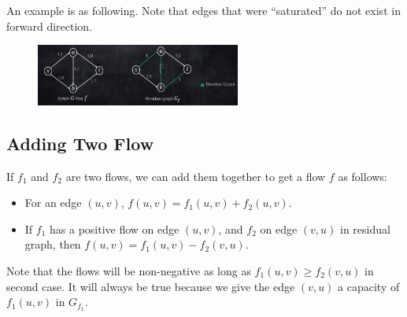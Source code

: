 An example is as following. Note that edges that were ``saturated'' do not exist in forward direction.
\begin{figure}[H]
	\centering
	\includegraphics[width=0.6\textwidth]{fig/gf.png}
\end{figure}

\subsection{Adding Two Flow}
If $f_1$ and $f_2$ are two flows, we can add them together to get a flow $f$ as follows:
\begin{itemize}
	\item For an edge $(u,v)$, $f(u,v) = f_1(u,v) + f_2(u,v)$.
	\item If $f_1$ has a positive flow on edge $(u, v)$, and $f_2$ on edge $(v, u)$ in residual graph, then $f(u,v) = f_1(u,v) - f_2(v,u)$.
\end{itemize}
Note that the flows will be non-negative as long as $f_1(u,v) \ge f_2(v, u)$ in second case. It will always be true because we give the edge $(v, u)$ a capacity of $f_1(u, v)$ in $G_{f_1}$.


